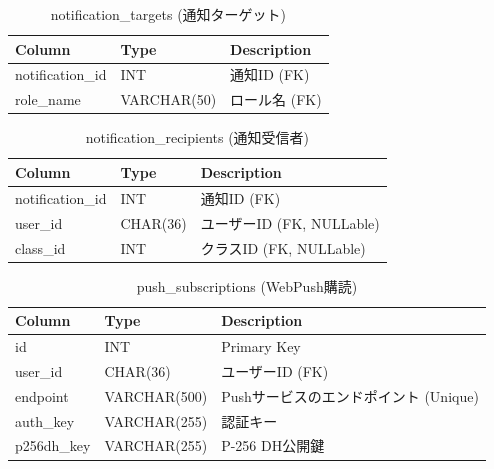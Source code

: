 \documentclass[paper=a4, fontsize=11pt]{jlreq}
\begin{document}
\begin{table}[H]
    \centering
    \caption{notification\_targets (通知ターゲット)}
    \begin{tabularx}{\textwidth}{|l|l|X|}
        \toprule
        Column & Type & Description \\
        \midrule
        notification\_id & INT & 通知ID (FK) \\
        role\_name & VARCHAR(50) & ロール名 (FK) \\
        \bottomrule
    \end{tabularx}
\end{table}

\begin{table}[H]
    \centering
    \caption{notification\_recipients (通知受信者)}
    \begin{tabularx}{\textwidth}{|l|l|X|}
        \toprule
        Column & Type & Description \\
        \midrule
        notification\_id & INT & 通知ID (FK) \\
        user\_id & CHAR(36) & ユーザーID (FK, NULLable) \\
        class\_id & INT & クラスID (FK, NULLable) \\
        \bottomrule
    \end{tabularx}
\end{table}

\begin{table}[H]
    \centering
    \caption{push\_subscriptions (WebPush購読)}
    \begin{tabularx}{\textwidth}{|l|l|X|}
        \toprule
        Column & Type & Description \\
        \midrule
        id & INT & Primary Key \\
        user\_id & CHAR(36) & ユーザーID (FK) \\
        endpoint & VARCHAR(500) & Pushサービスのエンドポイント (Unique) \\
        auth\_key & VARCHAR(255) & 認証キー \\
        p256dh\_key & VARCHAR(255) & P-256 DH公開鍵 \\
        \bottomrule
    \end{tabularx}
\end{table}
\end{document}
